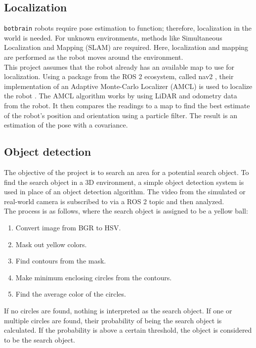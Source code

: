 \subsection{Localization}\label{sub:localization} 
\texttt{botbrain} robots require pose estimation to function; therefore, localization in the world is needed.
For unknown environments, methods like Simultaneous Localization and Mapping (SLAM) are required. Here, localization and mapping are performed as the robot moves around the environment. \\

This project assumes that the robot already has an available map to use for localization.
Using a package from the ROS 2 ecosystem, called nav2 \cite{nav2}, their implementation of an Adaptive Monte-Carlo Localizer (AMCL) is used to localize the robot \cite{amcl}.
The AMCL algorithm works by using LiDAR and odometry data from the robot. It then compares the readings to a map to find the best estimate of the robot's position and orientation using a particle filter. The result is an estimation of the pose with a covariance.

\subsection{Object detection}\label{sub:object_detection}
The objective of the project is to search an area for a potential search object.
To find the search object in a 3D environment, a simple object detection system is used in place of an object detection algorithm. The video from the simulated or real-world camera is subscribed to via a ROS 2 topic and then analyzed. \\

The process is as follows, where the search object is assigned to be a yellow ball:
\begin{enumerate}
  \item Convert image from BGR to HSV.
  \item Mask out yellow colors.
  \item Find contours from the mask.
  \item Make minimum enclosing circles from the contours.
  \item Find the average color of the circles.
\end{enumerate}

If no circles are found, nothing is interpreted as the search object. If one or multiple circles are found, their probability of being the search object is calculated.
If the probability is above a certain threshold, the object is considered to be the search object.

